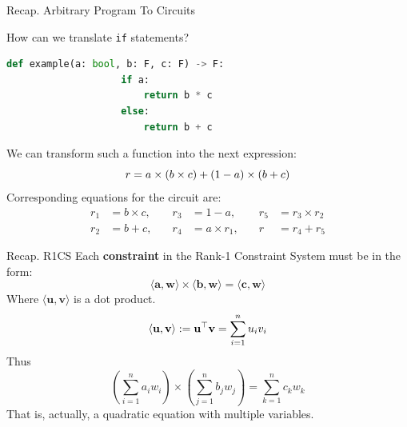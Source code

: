 \documentclass{zkdl-presentation-template}
\begin{document}
    \begin{frame}[fragile]{Recap. Arbitrary Program To Circuits}
        \begin{example}
            How can we translate \texttt{if} statements?
            \begin{lstlisting}[language=Python, numbers=none, autogobble=true, xleftmargin=8pt]
                def example(a: bool, b: F, c: F) -> F:
                    if a:
                        return b * c 
                    else:
                        return b + c
            \end{lstlisting}
            \pause
            We can transform such a function into the next expression:
            \vspace{-8pt}
            \begin{equation*}
                r = a \times (b \times c) + (1 - a) \times (b + c)    
                \vspace{-8pt}
            \end{equation*}
            \pause
            Corresponding equations for the circuit are:
            \vspace{-8pt}
            \begin{equation*}
                \begin{aligned}
                    r_1 &= b \times c, \quad &r_3 &= 1 - a, \quad &r_5 &= r_3 \times r_2 \\
                    r_2 &= b + c, \quad &r_4 &= a \times r_1, \quad &r &= r_4 + r_5
                \end{aligned}
            \end{equation*}
        \end{example}
    \end{frame}

    \begin{frame}{Recap. R1CS}
        Each \textbf{constraint} in the Rank-1 Constraint System must be in the form:
        \begin{equation*}
            \langle \mathbf{a}, \mathbf{w}\rangle \times \langle \mathbf{b}, \mathbf{w}\rangle = \langle \mathbf{c}, \mathbf{w}\rangle
        \end{equation*}
        \pause
        Where $\langle \mathbf{u}, \mathbf{v}\rangle$ is a dot product.
        \vspace{-10pt}
        \begin{equation*}
            \langle \mathbf{u}, \mathbf{v} \rangle := \mathbf{u}^{\top}\mathbf{v} = \sum_{i=1}^{n} u_i v_i 
            \vspace{-5pt}
        \end{equation*}
        \pause
        Thus
        \vspace{-5pt}
        \begin{equation*}
            \left(\sum_{i=1}^{n} a_i w_i\right) \times \left(\sum_{j=1}^{n} b_j w_j\right) = \sum_{k=1}^{n} c_k w_k
        \end{equation*}
        That is, actually, a quadratic equation with multiple variables.
    \end{frame}
\end{document}
